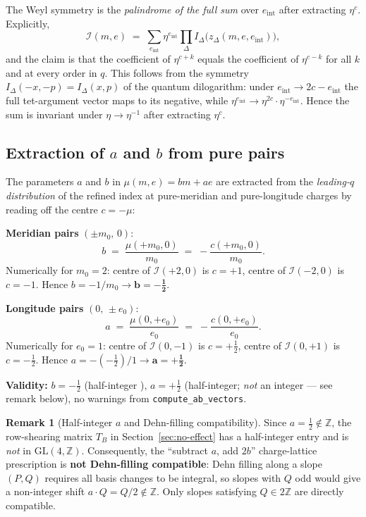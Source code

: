 \documentclass[12pt,a4paper]{article}
\newcommand{\IRef}{\mathcal{I}}
\newcommand{\IDelta}{I_\Delta}
\newcommand{\ZZ}{\mathbb{Z}}
\theoremstyle{definition}
\newtheorem{remark}{Remark}
\begin{document}
\medskip
The Weyl symmetry is the \emph{palindrome of the full sum} over
$e_{\mathrm{int}}$ after extracting $\eta^c$. Explicitly,
\begin{equation}\label{eq:palindrome}
  \IRef(m,e) \;=\; \sum_{e_{\mathrm{int}}} \eta^{e_{\mathrm{int}}}
  \prod_{\Delta} \IDelta\!\bigl(z_\Delta(m,e,e_{\mathrm{int}})\bigr),
\end{equation}
and the claim is that the coefficient of $\eta^{c + k}$ equals the
coefficient of $\eta^{c - k}$ for all $k$ and at every order in $q$.
This follows from the symmetry $\IDelta(-x,-p) = \IDelta(x,p)$
of the quantum dilogarithm: under $e_{\mathrm{int}} \to 2c - e_{\mathrm{int}}$
the full tet-argument vector maps to its negative, while
$\eta^{e_{\mathrm{int}}} \to \eta^{2c}\cdot \eta^{-e_{\mathrm{int}}}$.
Hence the sum is invariant under $\eta \to \eta^{-1}$ after extracting $\eta^c$.

\subsection{Extraction of \texorpdfstring{$a$}{a} and \texorpdfstring{$b$}{b} from pure pairs}

The parameters $a$ and $b$ in $\mu(m,e)=bm+ae$ are extracted from the
\emph{leading-$q$ distribution} of the refined index at pure-meridian
and pure-longitude charges by reading off the centre $c = -\mu$:

\medskip
\noindent
\textbf{Meridian pairs} $(\pm m_0,\, 0)$:
\[
  b \;=\; \frac{\mu(+m_0,0)}{m_0} \;=\; -\frac{c(+m_0,0)}{m_0}.
\]
Numerically for $m_0=2$: centre of $\IRef(+2,0)$ is $c=+1$,
centre of $\IRef(-2,0)$ is $c=-1$.
Hence $b = -1/m_0 \to \mathbf{b = -\tfrac{1}{2}}$.

\medskip
\noindent
\textbf{Longitude pairs} $(0,\, \pm e_0)$:
\[
  a \;=\; \frac{\mu(0,+e_0)}{e_0} \;=\; -\frac{c(0,+e_0)}{e_0}.
\]
Numerically for $e_0=1$: centre of $\IRef(0,-1)$ is $c=+\tfrac12$,
centre of $\IRef(0,+1)$ is $c=-\tfrac12$.
Hence $a = -(-\tfrac12)/1 \to \mathbf{a = +\tfrac{1}{2}}$.

\medskip
\noindent
\textbf{Validity:} $b = -\tfrac12$ (half-integer \checkmark),
$a = +\tfrac{1}{2}$ (half-integer; \emph{not} an integer — see remark below),
no warnings from \texttt{compute\_ab\_vectors}.

\begin{remark}[Half-integer $a$ and Dehn-filling compatibility]
Since $a = \tfrac12 \notin \ZZ$, the row-shearing matrix $T_B$ in
Section~\ref{sec:no-effect} has a half-integer entry and is
\emph{not} in $\mathrm{GL}(4,\ZZ)$.
Consequently, the ``subtract $a$, add $2b$'' charge-lattice prescription
is \textbf{not Dehn-filling compatible}: Dehn filling along a slope
$(P,Q)$ requires all basis changes to be integral, so slopes with
$Q$ odd would give a non-integer shift $a \cdot Q = Q/2 \notin \ZZ$.
Only slopes satisfying $Q \in 2\ZZ$ are directly compatible.
\end{remark}
\end{document}
